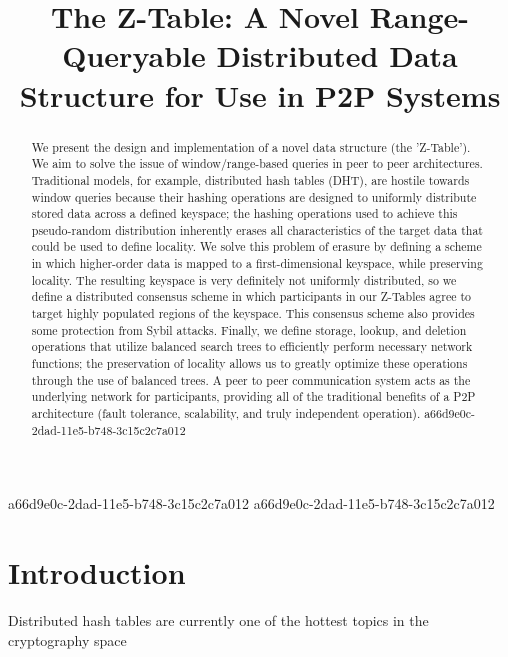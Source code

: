 \documentclass[12pt]{article}
\title{The Z-Table: A Novel Range-Queryable Distributed Data Structure for Use in P2P Systems}
\begin{document}
\maketitle

\begin{abstract}
We present the design and implementation of a novel data structure (the 'Z-Table'). We aim to solve the issue of window/range-based queries in peer to peer architectures. Traditional models, for example,  distributed hash tables (DHT), are hostile towards window queries because their hashing operations are designed to uniformly distribute stored data across a defined keyspace; the hashing operations used to achieve this pseudo-random distribution inherently erases all characteristics of the target data that could be used to define locality. We solve this problem of erasure by defining a scheme in which higher-order data is mapped to a first-dimensional keyspace, while preserving locality. The resulting keyspace is very definitely not uniformly distributed, so we define a distributed consensus scheme in which participants in our Z-Tables agree to target highly populated regions of the keyspace. This consensus scheme also provides some protection from Sybil attacks. Finally, we define storage, lookup, and deletion operations that utilize balanced search trees to efficiently perform necessary network functions; the preservation of locality allows us to greatly optimize these operations through the use of balanced trees. A peer to peer communication system acts as the underlying network for participants, providing all of the traditional benefits of a P2P architecture (fault tolerance, scalability, and truly independent operation).
a66d9e0c-2dad-11e5-b748-3c15c2c7a012\end{abstract}

a66d9e0c-2dad-11e5-b748-3c15c2c7a012
\newpage
a66d9e0c-2dad-11e5-b748-3c15c2c7a012\section{Introduction}
Distributed hash tables are currently one of the hottest topics in the cryptography space~\cite{Stoica:2001dj,Rowstron:2001ea,Ratnasamy:2001wn}

\printbibliography
\end{document}

